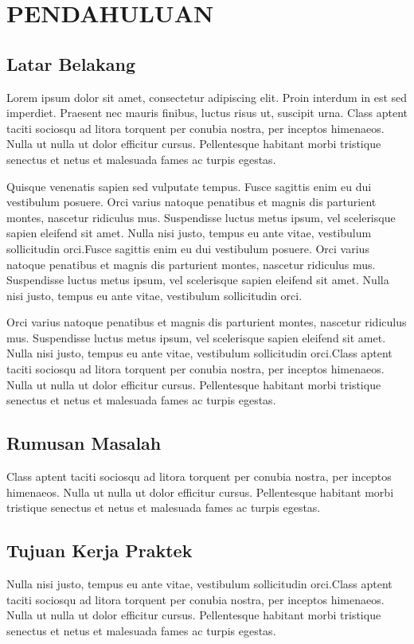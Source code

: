 \chapter{PENDAHULUAN}

\section{Latar Belakang}

Lorem ipsum dolor sit amet, consectetur adipiscing elit. Proin interdum in est sed imperdiet. Praesent nec mauris finibus, luctus risus ut, suscipit urna. Class aptent taciti sociosqu ad litora torquent per conubia nostra, per inceptos himenaeos. Nulla ut nulla ut dolor efficitur cursus. Pellentesque habitant morbi tristique senectus et netus et malesuada fames ac turpis egestas.

Quisque venenatis sapien sed vulputate tempus. Fusce sagittis enim eu dui vestibulum posuere. Orci varius natoque penatibus et magnis dis parturient montes, nascetur ridiculus mus. Suspendisse luctus metus ipsum, vel scelerisque sapien eleifend sit amet. Nulla nisi justo, tempus eu ante vitae, vestibulum sollicitudin orci.Fusce sagittis enim eu dui vestibulum posuere. Orci varius natoque penatibus et magnis dis parturient montes, nascetur ridiculus mus. Suspendisse luctus metus ipsum, vel scelerisque sapien eleifend sit amet. Nulla nisi justo, tempus eu ante vitae, vestibulum sollicitudin orci.

Orci varius natoque penatibus et magnis dis parturient montes, nascetur ridiculus mus. Suspendisse luctus metus ipsum, vel scelerisque sapien eleifend sit amet. Nulla nisi justo, tempus eu ante vitae, vestibulum sollicitudin orci.Class aptent taciti sociosqu ad litora torquent per conubia nostra, per inceptos himenaeos. Nulla ut nulla ut dolor efficitur cursus. Pellentesque habitant morbi tristique senectus et netus et malesuada fames ac turpis egestas.

\section{Rumusan Masalah}
Class aptent taciti sociosqu ad litora torquent per conubia nostra, per inceptos himenaeos. Nulla ut nulla ut dolor efficitur cursus. Pellentesque habitant morbi tristique senectus et netus et malesuada fames ac turpis egestas.

\section{Tujuan Kerja Praktek}
Nulla nisi justo, tempus eu ante vitae, vestibulum sollicitudin orci.Class aptent taciti sociosqu ad litora torquent per conubia nostra, per inceptos himenaeos. Nulla ut nulla ut dolor efficitur cursus. Pellentesque habitant morbi tristique senectus et netus et malesuada fames ac turpis egestas.

